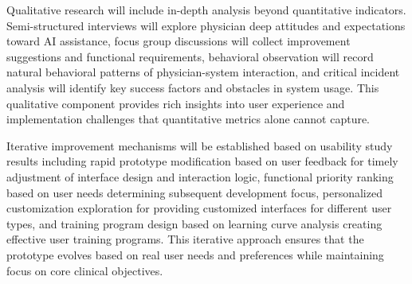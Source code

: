 Qualitative research will include in-depth analysis beyond quantitative indicators. Semi-structured interviews will explore physician deep attitudes and expectations toward AI assistance, focus group discussions will collect improvement suggestions and functional requirements, behavioral observation will record natural behavioral patterns of physician-system interaction, and critical incident analysis will identify key success factors and obstacles in system usage. This qualitative component provides rich insights into user experience and implementation challenges that quantitative metrics alone cannot capture.

Iterative improvement mechanisms will be established based on usability study results including rapid prototype modification based on user feedback for timely adjustment of interface design and interaction logic, functional priority ranking based on user needs determining subsequent development focus, personalized customization exploration for providing customized interfaces for different user types, and training program design based on learning curve analysis creating effective user training programs. This iterative approach ensures that the prototype evolves based on real user needs and preferences while maintaining focus on core clinical objectives.

